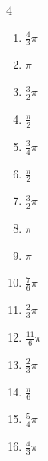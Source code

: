 \begin{multicols}{4}
\begin{enumerate}
  \item $\displaystyle \frac{4}{3}\pi$

  \item $\displaystyle \pi$

  \item $\displaystyle \frac{3}{2}\pi$

  \item $\displaystyle \frac{\pi}{2}$

  \item $\displaystyle \frac{3}{4}\pi$

  \item $\displaystyle \frac{\pi}{2}$

  \item $\displaystyle \frac{3}{2}\pi$

  \item $\displaystyle \pi$

  \item $\displaystyle \pi$

  \item $\displaystyle \frac{7}{6}\pi$

  \item $\displaystyle \frac{2}{3}\pi$

  \item $\displaystyle \frac{11}{6}\pi$

  \item $\displaystyle \frac{2}{3}\pi$

  \item $\displaystyle \frac{\pi}{6}$

  \item $\displaystyle \frac{5}{4}\pi$

  \item $\displaystyle \frac{4}{3}\pi$


\end{enumerate}
\end{multicols}
